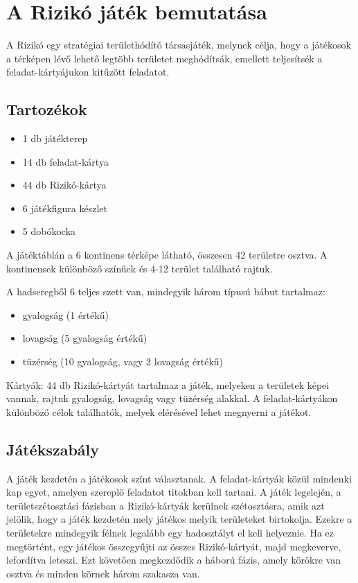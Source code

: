 \section{A Rizikó játék bemutatása}

A Rizikó egy stratégiai területhódító társasjáték, melynek célja, hogy a játékosok a térképen lévő lehető legtöbb területet meghódítsák, emellett teljesítsék a feladat-kártyájukon kitűzött feladatot.\cite{riziko}


\subsection*{Tartozékok}
\begin{itemize}
\setlength\itemsep{0em}
\item 1 db játékterep 
\item 14 db feladat-kártya 
\item 44 db Rizikó-kártya 
\item 6 játékfigura készlet 
\item 5 dobókocka 
\end{itemize}

A játéktáblán a 6 kontinens térképe látható, összesen 42 területre osztva.
A kontinensek különböző színűek és 4-12 terület található rajtuk.

A hadseregből 6 teljes szett van, mindegyik három típusú bábut tartalmaz:
\begin{itemize}
\setlength\itemsep{0em}
\item gyalogság (1 értékű) 
\item lovagság (5 gyalogság értékű) 
\item tüzérség (10 gyalogság, vagy 2 lovagság értékű)
\end{itemize}

Kártyák: 44 db Rizikó-kártyát tartalmaz a játék, melyeken a területek képei vannak, rajtuk gyalogság, lovagság vagy tüzérség alakkal.
A feladat-kártyákon különböző célok találhatók, melyek elérésével lehet megnyerni a játékot.

\subsection*{Játékszabály}

A játék kezdetén a játékosok színt választanak.
A feladat-kártyák közül mindenki kap egyet, amelyen szereplő feladatot titokban kell tartani.
A játék legelején, a területszétosztási fázisban a Rizikó-kártyák kerülnek szétosztásra, amik azt jelölik, hogy a játék kezdetén mely játékos melyik területeket birtokolja.
Ezekre a területekre mindegyik félnek legalább egy hadosztályt el kell helyeznie.
Ha ez megtörtént, egy játékos összegyűjti az összes Rizikó-kártyát, majd megkeverve, lefordítva leteszi.
Ezt követően megkezdődik a háború fázis, amely körökre van osztva és minden körnek három szakasza van.

